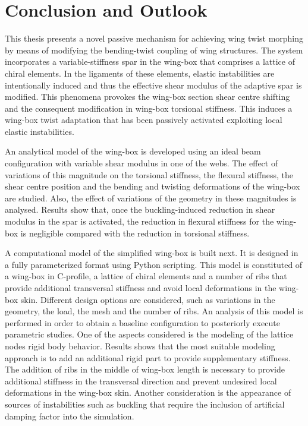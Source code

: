 \chapter{Conclusion and Outlook} \label{chap:summary}
%
%

This thesis presents a novel passive mechanism for achieving wing twist morphing by means of modifying the bending-twist coupling of wing structures. The system incorporates a variable-stiffness spar in the wing-box that comprises a lattice of chiral elements. In the ligaments of these elements, elastic instabilities are intentionally induced and thus the effective shear modulus of the adaptive spar is modified. This phenomena provokes the wing-box section shear centre shifting and the consequent modification in wing-box torsional stiffness. This induces a wing-box twist adaptation that has been passively activated exploiting local elastic instabilities.

An analytical model of the wing-box is developed using an ideal beam configuration with variable shear modulus in one of the webs. The effect of variations of this magnitude on the torsional stiffness, the flexural stiffness, the shear centre position and the bending and twisting deformations of the wing-box are studied. Also, the effect of variations of the geometry in these magnitudes is analysed. Results show that, once the buckling-induced reduction in shear modulus in the spar is activated, the reduction in flexural stiffness for the wing-box is negligible compared with the reduction in torsional stiffness. 

A computational model of the simplified wing-box is built next. It is designed in a fully parameterized format using Python scripting. This model is constituted of a wing-box in C-profile, a lattice of chiral elements and a number of ribs that provide additional transversal stiffness and avoid local deformations in the wing-box skin. Different design options are considered, such as variations in the geometry, the load, the mesh and the number of ribs. An analysis of this model is performed in order to obtain a baseline configuration to posteriorly execute parametric studies. One of the aspects considered is the modeling of the lattice nodes rigid body behavior. Results shows that the most suitable modeling approach is to add an additional rigid part to provide supplementary stiffness. The addition of ribs in the middle of wing-box length is necessary to provide additional stiffness in the transversal direction and prevent undesired local deformations in the wing-box skin. Another consideration is the appearance of sources of instabilities such as buckling that require the inclusion of artificial damping factor into the simulation. 

